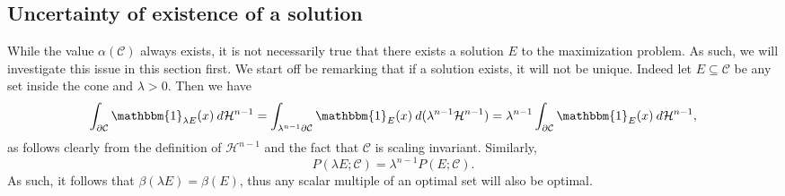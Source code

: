 \documentclass[artcle, 11pt, reqno]{amsart}
\numberwithin{equation}{section}
\newcommand{\R}{\mathbb{R}}
\newcommand{\N}{\mathbb{N}}
\newcommand{\Hd}{\mathcal{H}}
\newcommand{\ind}{\mathbbm{1}}
\newcommand{\C}{\mathcal{C}}
\newcommand{\ninfty}{n \rightarrow \infty}
\newcommand{\dd}{\: d}
\theoremstyle{plain}
\theoremstyle{definition}
\theoremstyle{remark}
\begin{document}
	\subsection{Uncertainty of existence of a solution}
	While the value $\alpha(\mathcal{C})$ always exists, it is not necessarily true that there exists a solution $E$ to the maximization problem. As such, we will investigate this issue in this section first. We start off be remarking that if a solution exists, it will not be unique. Indeed let $E \subseteq \C$ be any set inside the cone and $\lambda > 0$. Then we have 
	\[
	\int_{\partial \C} \ind_{\lambda E}(x) \dd\Hd^{n-1} = \int_{\lambda^{n-1}\partial \C} \ind_{E}(x) \dd(\lambda^{n-1}\Hd^{n-1}) = \lambda^{n-1}\int_{\partial \C} \ind_{E}(x) \dd \Hd^{n-1},
	\]
	as follows clearly from the definition of $\Hd^{n-1}$ and the fact that $\C$ is scaling invariant. Similarly, $$P(\lambda E;\C) = \lambda^{n-1}P(E;\C).$$
	As such, it follows that $\beta(\lambda E) = \beta(E)$, thus any scalar multiple of an optimal set will also be optimal. 
	\\

	
\end{document}
